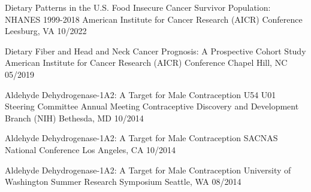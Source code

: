 




\begin{cvhonors}

  \cvhonor
    {Dietary Patterns in the U.S. Food Insecure Cancer Survivor Population: NHANES 1999-2018} %
    {American Institute for Cancer Research (AICR) Conference} %
    {Leesburg, VA} %
    {10/2022} %
    
  \cvhonor
    {Dietary Fiber and Head and Neck Cancer Prognosis: A Prospective Cohort Study} %
    {American Institute for Cancer Research (AICR) Conference} %
    {Chapel Hill, NC} %
    {05/2019} %

  \cvhonor
    {Aldehyde Dehydrogenase-1A2: A Target for Male Contraception} %
    {U54 U01 Steering Committee Annual Meeting 
Contraceptive Discovery and Development Branch (NIH)} %
    {Bethesda, MD} %
    {10/2014} %
    
  \cvhonor
    {Aldehyde Dehydrogenase-1A2: A Target for Male Contraception} %
    {SACNAS National Conference} %
    {Los Angeles, CA} %
    {10/2014} %
    
  \cvhonor
    {Aldehyde Dehydrogenase-1A2: A Target for Male Contraception} %
    {University of Washington Summer Research Symposium} %
    {Seattle, WA }%
    {08/2014} %

\end{cvhonors}

